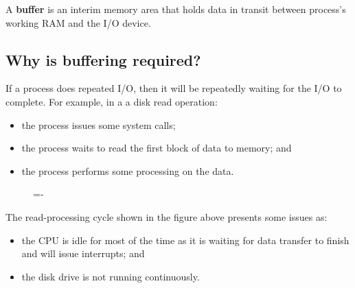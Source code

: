 \documentclass[a4paper]{systems-software}
\begin{document}
A \textbf{buffer} is an interim memory area that holds data in transit between process's working RAM and the I/O device.

\subsection*{Why is buffering required?}

If a process does repeated I/O, then it will be repeatedly waiting for the I/O to complete. For example, in a a disk read operation:
\begin{itemize}
	\item the process issues some system calls;
	\item the process waits to read the first block of data to memory; and
	\item the process performs some processing on the data.
\end{itemize}

\begin{figure}[H]
  \lineskip=-\fboxrule
\end{figure}

The read-processing cycle shown in the figure above presents some issues as:
\begin{itemize}
	\item the CPU is idle for most of the time as it is waiting for data transfer to finish and will issue interrupts; and
	\item the disk drive is not running continuously.
\end{itemize}
\end{document}
